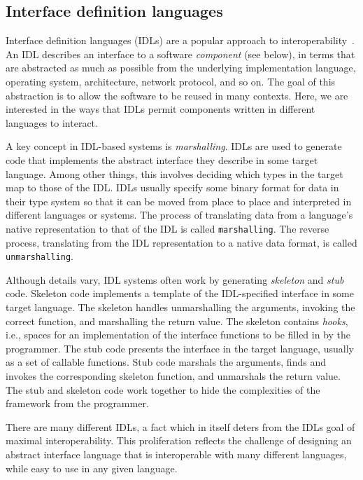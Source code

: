 
\subsection{Interface definition languages}
\label{idls}

Interface definition languages (IDLs) are a popular approach to interoperability~\cite{kaplan98idl}. An IDL describes an interface to a software \emph{component} (see below), in terms that are abstracted as much as possible from the underlying implementation language, operating system, architecture, network protocol, and so on. The goal of this abstraction is to allow the software to be reused in many contexts. Here, we are interested in the ways that IDLs permit components written in different languages to interact.

A key concept in IDL-based systems is \emph{marshalling}. IDLs are used to generate code that implements the abstract interface they describe in some target language. Among other things, this involves deciding which types in the target map to those of the IDL. IDLs usually specify some binary format for data in their type system so that it can be moved from place to place and interpreted in different languages or systems. The process of translating data from a language's native representation to that of the IDL is called \texttt{marshalling}. The reverse process, translating from the IDL representation to a native data format, is called \texttt{unmarshalling}.

Although details vary, IDL systems often work by generating \emph{skeleton} and \emph{stub} code. Skeleton code implements a template of the IDL-specified interface in some target language. The skeleton handles unmarshalling the arguments, invoking the correct function, and marshalling the return value. The skeleton contains \emph{hooks}, i.e., spaces for an implementation of the interface functions to be filled in by the programmer. The stub code presents the interface in the target language, usually as a set of callable functions. Stub code marshals the arguments, finds and invokes the corresponding skeleton function, and unmarshals the return value. The stub and skeleton code work together to hide the complexities of the framework from the programmer.

There are many different IDLs, a fact which in itself deters from the IDLs goal of maximal interoperability. This proliferation reflects the challenge of designing an abstract interface language that is interoperable with many different languages, while easy to use in any given language.


